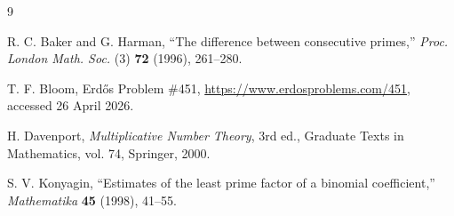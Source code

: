 \documentclass[11pt]{article}
\begin{document}
\begin{thebibliography}{9}

R. C. Baker and G. Harman,
``The difference between consecutive primes,''
\emph{Proc. London Math. Soc.} (3) \textbf{72} (1996), 261--280.

T. F. Bloom,
Erd\H{o}s Problem \#451,
\url{https://www.erdosproblems.com/451},
accessed 26 April 2026.

H. Davenport,
\emph{Multiplicative Number Theory},
3rd ed., Graduate Texts in Mathematics, vol. 74,
Springer, 2000.

S. V. Konyagin,
``Estimates of the least prime factor of a binomial coefficient,''
\emph{Mathematika} \textbf{45} (1998), 41--55.

\end{thebibliography}
\end{document}
